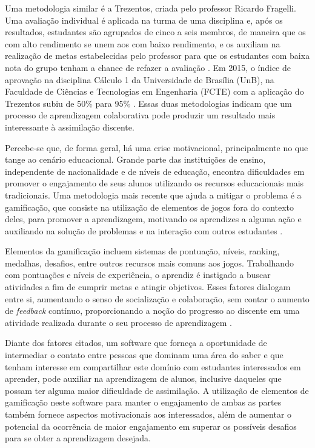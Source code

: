 Uma metodologia similar é a Trezentos, criada pelo professor Ricardo Fragelli. Uma avaliação individual é aplicada na turma de uma disciplina e, após os resultados, estudantes são agrupados de cinco a seis membros, de maneira que os com alto rendimento se unem aos com baixo rendimento, e os auxiliam na realização de metas estabelecidas pelo professor para que os estudantes com baixa nota do grupo tenham a chance de refazer a avaliação \cite{trezentos}. Em 2015, o índice de aprovação na disciplina Cálculo 1 da Universidade de Brasília (UnB), na Faculdade de Ciências e Tecnologias em Engenharia (FCTE) com a aplicação do Trezentos  subiu de 50\% para 95\% \cite{trezentosResultados}. Essas duas metodologias indicam que um processo de aprendizagem colaborativa pode produzir um resultado mais interessante à assimilação discente.

Percebe-se que, de forma geral, há uma crise motivacional, principalmente no que tange ao cenário educacional. Grande parte das instituições de ensino, independente de nacionalidade e de níveis de educação, encontra dificuldades em promover o engajamento de seus alunos utilizando os recursos educacionais mais tradicionais. Uma metodologia mais recente que ajuda a mitigar o problema é a gamificação, que consiste na utilização de elementos de jogos fora do contexto deles, para promover a aprendizagem, motivando os aprendizes a alguma ação e auxiliando na solução de problemas e na interação com outros estudantes  \cite{tolomei2017gamificaccao}.

Elementos da gamificação incluem sistemas de pontuação, níveis, ranking, medalhas, desafios, entre outros recursos mais comuns aos jogos. Trabalhando com pontuações e níveis de experiência, o aprendiz é instigado a buscar atividades a fim de cumprir metas e atingir objetivos. Esses fatores dialogam entre si, aumentando o senso de socialização e colaboração, sem contar o aumento de \textit{feedback} contínuo, proporcionando a noção do progresso ao discente em uma atividade realizada durante o seu processo de aprendizagem \cite{tolomei2017gamificaccao}.

Diante dos fatores citados, um software que forneça a oportunidade de intermediar o contato entre pessoas que dominam uma área do saber e que tenham interesse em compartilhar este domínio com estudantes interessados em aprender, pode auxiliar na aprendizagem de alunos, inclusive daqueles que possam ter alguma maior dificuldade de assimilação. A utilização de elementos de gamificação neste software para manter o engajamento de ambas as partes também fornece aspectos motivacionais aos interessados, além de aumentar o potencial da ocorrência de maior engajamento em superar os possíveis desafios para se obter a aprendizagem desejada.


